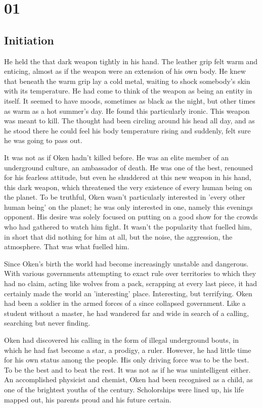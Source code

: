 \chapter{01}
\section{Initiation}


He held the that dark weapon tightly in his hand. The leather grip felt warm and enticing, almost as if the weapon were an extension of his own body. He knew that beneath the warm grip lay a cold metal, waiting to shock somebody's skin with its temperature. He had come to think of the weapon as being an entity in itself. It seemed to have moods, sometimes as black as the night, but other times as warm as a hot summer's day. He found this particularly ironic. This weapon was meant to kill. The thought had been circling around his head all day, and as he stood there he could feel his body temperature rising and suddenly, felt sure he was going to pass out.

It was not as if Oken hadn't killed before. He was an elite member of an underground culture, an ambassador of death. He was one of the best, renouned for his fearless attitude, but even he shuddered at this new weapon in his hand, this dark weapon, which threatened the very existence of every human being on the planet. To be truthful, Oken wasn't particularly interested in 'every other human being' on the planet; he was only interested in one, namely this evenings opponent. His desire was solely focused on putting on a good show for the crowds who had gathered to watch him fight. It wasn't the popularity that fuelled him, in short that did nothing for him at all, but the noise, the aggression, the atmosphere. That was what fuelled him.

Since Oken's birth the world had become increasingly unstable and dangerous. With various governments attempting to exact rule over territories to which they had no claim, acting like wolves from a pack, scrapping at every last piece, it had certainly made the world an 'interesting' place. Interesting, but terrifying. Oken had been a soldier in the armed forces of a since collapsed government. Like a student without a master, he had wandered far and wide in search of a calling, searching but never finding.

Oken had discovered his calling in the form of illegal underground bouts, in which he had fast become a star, a prodigy, a ruler. However, he had little time for his own status among the people. His only driving force was to be the best. To be the best and to beat the rest. It was not as if he was unintelligent either. An accomplished physicist and chemist, Oken had been recognised as a child, as one of the brightest youths of the century. Scholorships were lined up, his life mapped out, his parents proud and his future certain.

